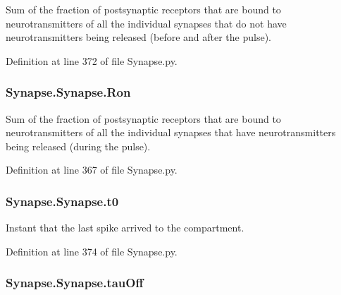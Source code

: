 Sum of the fraction of postsynaptic receptors that are bound to neurotransmitters of all the individual synapses that do not have neurotransmitters being released (before and after the pulse). 



Definition at line 372 of file Synapse.\-py.

\hypertarget{class_synapse_1_1_synapse_ae759c51a7196995510fe3eb086050c76}{
\subsubsection[{Ron}]{\setlength{\rightskip}{0pt plus 5cm}Synapse.\-Synapse.\-Ron}}\label{class_synapse_1_1_synapse_ae759c51a7196995510fe3eb086050c76}


Sum of the fraction of postsynaptic receptors that are bound to neurotransmitters of all the individual synapses that have neurotransmitters being released (during the pulse). 



Definition at line 367 of file Synapse.\-py.

\hypertarget{class_synapse_1_1_synapse_ad0adf1cb832bd7ce7918f2779171d7d7}{
\subsubsection[{t0}]{\setlength{\rightskip}{0pt plus 5cm}Synapse.\-Synapse.\-t0}}\label{class_synapse_1_1_synapse_ad0adf1cb832bd7ce7918f2779171d7d7}


Instant that the last spike arrived to the compartment. 



Definition at line 374 of file Synapse.\-py.

\hypertarget{class_synapse_1_1_synapse_afd5638a223c3fdcc672002dbced7bed0}{
\subsubsection[{tau\-Off}]{\setlength{\rightskip}{0pt plus 5cm}Synapse.\-Synapse.\-tau\-Off}}\label{class_synapse_1_1_synapse_afd5638a223c3fdcc672002dbced7bed0}


